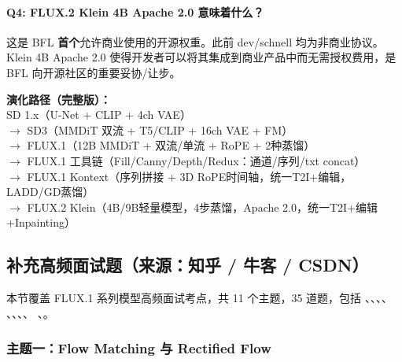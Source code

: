 \paragraph{Q4: FLUX.2 Klein 4B Apache 2.0 意味着什么？}
这是 BFL \textbf{首个}允许商业使用的开源权重。此前 dev/schnell 均为非商业协议。Klein 4B Apache 2.0 使得开发者可以将其集成到商业产品中而无需授权费用，是 BFL 向开源社区的重要妥协/让步。

\begin{summarybox}
\textbf{演化路径（完整版）：}\\
SD 1.x（U-Net + CLIP + 4ch VAE）\\
$\to$ SD3（MMDiT 双流 + T5/CLIP + 16ch VAE + FM）\\
$\to$ FLUX.1（12B MMDiT + 双流/单流 + RoPE + 2种蒸馏）\\
$\to$ FLUX.1 工具链（Fill/Canny/Depth/Redux：通道/序列/txt concat）\\
$\to$ FLUX.1 Kontext（序列拼接 + 3D RoPE时间轴，统一T2I+编辑，LADD/GD蒸馏）\\
$\to$ FLUX.2 Klein（4B/9B轻量模型，4步蒸馏，Apache 2.0，统一T2I+编辑+Inpainting）
\end{summarybox}

\subsection{补充高频面试题（来源：知乎 / 牛客 / CSDN）}

\begin{summarybox}
本节覆盖 FLUX.1 系列模型高频面试考点，共 11 个主题，35 道题，包括
、、、、
、、、、
、。
\end{summarybox}

\subsubsection{主题一：Flow Matching 与 Rectified Flow}

